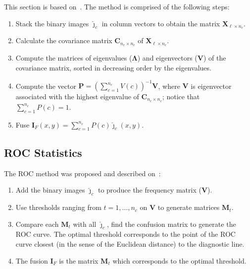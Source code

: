 \documentclass[journal]{IEEEtran}
\begin{document}
This section is based on~\cite{n_r,mit}.
The method is comprised of the following steps:
\begin{enumerate}
\item Stack the binary images $\bm{\widehat\jmath}_c$ in column vectors to obtain the matrix $\bm X_{\ell\times n_c}$.
\item Calculate the covariance matrix $\bm C_{n_c\times n_c}$ of $\bm X_{\ell\times n_c}$.
\item Compute the matrices of eigenvalues ($\bm\Lambda$) and eigenvectors ($\bm V$) of the covariance matrix, sorted in decreasing order by the eigenvalues. %
\item Compute the vector $\bm P=(\sum_{c=1}^{n_c} V(c))^{-1}{\bm V}$, where $\bm V$ is eigenvector associated with the highest eigenvalue of $\bm C_{n_c\times n_c}$; notice that $\sum_{c=1}^{n_c} P(c)=1$.
\item Fuse $\bm I_F(x,y)=\sum_{c=1}^{n_c} P(c)\bm{\widehat\jmath}_c(x,y)$.
\end{enumerate}

\subsection{ROC Statistics}
The ROC method was proposed and described on~\cite{gs}:
\begin{enumerate}
\item Add the binary images $\bm{\widehat\jmath}_c$ to produce the frequency matrix ($\bm V$).
\item Use thresholds ranging from $t=1,\dots,n_c$ on $\bm V$ to generate matrices $\bm M_t$.
\item Compare each $\bm M_t$ with all $\bm{\widehat\jmath}_c$, find the confusion matrix to generate the ROC curve. 
The optimal threshold corresponds to the point of the ROC curve closest (in the sense of the Euclidean distance) to the diagnostic line.
\item The fusion $\bm I_F$ is the matrix $\bm M_t$ which corresponds to the optimal threshold.
\end{enumerate}
\end{document}
